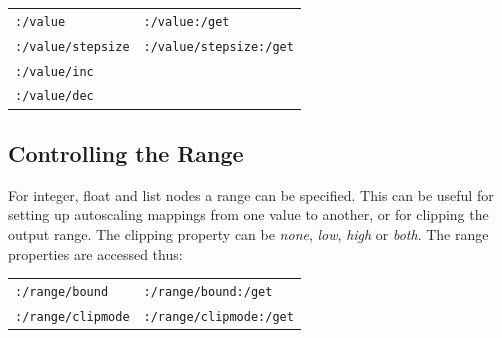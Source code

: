 \documentclass{NIME-alternate}
\begin{document}
\begin{tabular}{ll}
	\texttt{:/value} & \texttt{:/value:/get} \\
	\texttt{:/value/stepsize}  & \texttt{:/value/stepsize:/get} \\
	\texttt{:/value/inc} \\
	\texttt{:/value/dec} \\
\end{tabular}





\subsection{Controlling the Range} %
\label{sub:range}

For integer, float and list nodes a range can be specified. This can be useful for setting up autoscaling mappings from one value to another, or for clipping the output range. The clipping property can be \emph{none}, \emph{low}, \emph{high} or \emph{both}. The range properties are accessed thus:

\begin{tabular}{ll}
	\texttt{:/range/bound} & \texttt{:/range/bound:/get} \\
	\texttt{:/range/clipmode}  & \texttt{:/range/clipmode:/get} \\
\end{tabular}






%
%
%
\end{document}
